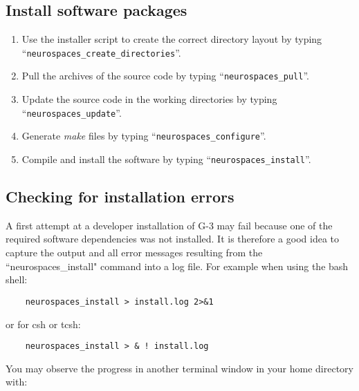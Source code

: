 \documentclass[12pt]{article}
\begin{document}

\subsection*{Install software packages}

\begin{enumerate}
   \item Use the installer script to create the correct directory layout by typing ``{\tt neurospaces\_create\_directories}''.
   \item Pull the archives of the source code by typing ``{\tt neurospaces\_pull}''.
   \item Update the source code in the working directories by typing ``{\tt neurospaces\_update}''.
   \item Generate {\it make} files by typing ``{\tt neurospaces\_configure}''.
   \item Compile and install the software by typing ``{\tt neurospaces\_install}''.
\end{enumerate}

\subsection*{Checking for installation errors}

A first attempt at a developer installation of G-3 may fail because
one of the required software dependencies was not installed.  It is
therefore a good idea to capture the output and all error messages
resulting from the ``neurospaces\_install" command into a log file.
For example when using the bash shell:

\begin{verbatim}
    neurospaces_install > install.log 2>&1
\end{verbatim}

or for csh or tcsh:

\begin{verbatim}
    neurospaces_install > & ! install.log
\end{verbatim}

You may observe the progress in another terminal window in your home
directory with:
\end{document}
